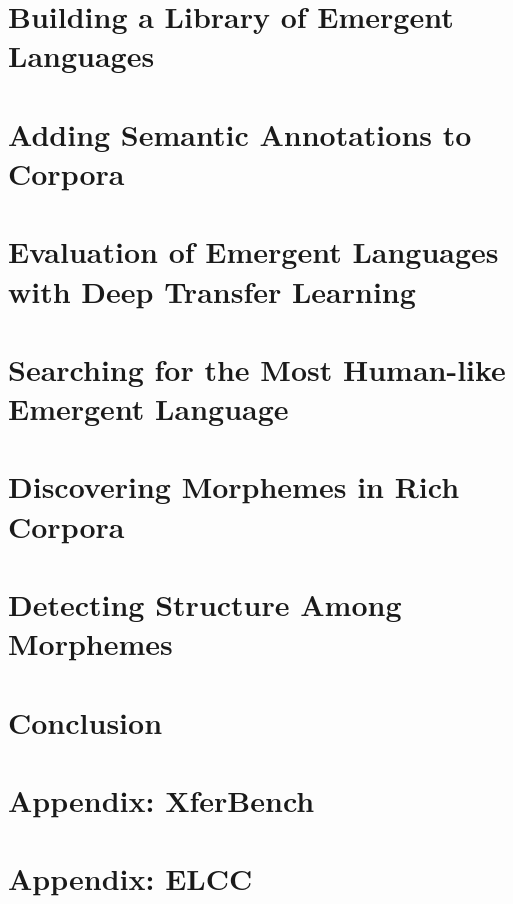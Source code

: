 \newpage
\tableofcontents*



\chapter{Building a Library of Emergent Languages }
\unskip\label{ch:elcc}





\chapter{Adding Semantic Annotations to Corpora }
\unskip\label{ch:rich-corpora}




\chapter{Evaluation of Emergent Languages with Deep Transfer Learning}
\unskip\label{ch:xferbench}



\chapter{Searching for the Most Human-like Emergent Language }
\unskip\label{ch:hpo}


\chapter{Discovering Morphemes in Rich Corpora }
\unskip\label{ch:morphemes}



\chapter{Detecting Structure Among Morphemes }
\unskip\label{ch:syntax}




\chapter{Conclusion}
\unskip\label{ch:conclusion}




\appendix

\chapter{Appendix: XferBench}


\chapter{Appendix: ELCC}



